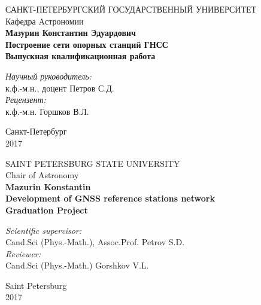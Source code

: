 \documentclass[a4paper,12pt]{report}
\begin{document}
\begin{titlepage}
\begin{center}
{\large САНКТ-ПЕТЕРБУРГСКИЙ ГОСУДАРСТВЕННЫЙ УНИВЕРСИТЕТ \\[6mm] Кафедра Aстрономии }\\
\vspace{2cm}
{\Large \bf Мазурин Константин Эдуардович } \\
\vspace{2cm}
{\LARGE \bf Построение сети опорных станций ГНСС} \\
\vspace{2cm}
{\large \bf Выпускная квалификационная работа } \\[4cm]
\end{center}

\begin{flushright}
{\it Научный руководитель:} \\
к.ф.-м.н., доцент {\Large Петров С.Д.}\\ [4mm]
{\it Рецензент:} \\
к.ф.-м.н. {\Large Горшков В.Л.} \\ 
\end{flushright}
\vspace{5cm}
\begin{center}
{\large Санкт-Петербург \\[5mm] 2017}
\end{center}
\end{titlepage}

\begin{titlepage}
\begin{center}
{\large SAINT PETERSBURG STATE UNIVERSITY \\[6mm] Chair of Astronomy }\\
\vspace{2cm}
{\Large \bf Mazurin Konstantin } \\
\vspace{2cm}
{\LARGE \bf Development of GNSS reference stations network } \\
\vspace{2cm}
{\large \bf Graduation Project } \\[3cm]
\end{center}

\begin{flushright}
{\it Scientific supervisor:} \\
Cand.Sci (Phys.-Math.), Assoc.Prof. {\Large Petrov S.D.}\\ [4mm]
{\it Reviewer:} \\
Cand.Sci (Phys.-Math.) {\Large Gorshkov V.L.}\\ 
\end{flushright}
\vspace{5cm}
\begin{center}
{\large Saint Petersburg \\[5mm] 2017}
\end{center}
\end{titlepage}
\end{document}
